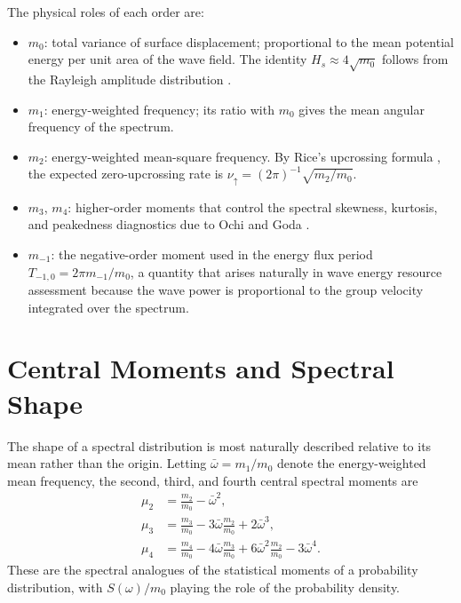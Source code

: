 \documentclass[journal]{IEEEtran}
\begin{document}
    The physical roles of each order are:
    \begin{itemize}
        \item $m_0$: total variance of surface displacement; proportional to the
        mean potential energy per unit area of the wave field.
        The identity $H_s \approx 4\sqrt{m_0}$ follows from the Rayleigh
        amplitude distribution \cite{Cartwright1956}.
        \item $m_1$: energy-weighted frequency; its ratio with $m_0$ gives the
        mean angular frequency of the spectrum.
        \item $m_2$: energy-weighted mean-square frequency.
        By Rice's upcrossing formula \cite{Rice1944, LonguetHiggins1952},
        the expected zero-upcrossing rate is
        $\nu_\uparrow = (2\pi)^{-1}\sqrt{m_2/m_0}$.
        \item $m_3$, $m_4$: higher-order moments that control the spectral
        skewness, kurtosis, and peakedness diagnostics due to
        Ochi \cite{Ochi1998} and Goda \cite{Goda1970}.
        \item $m_{-1}$: the negative-order moment used in the energy flux
        period $T_{-1,0} = 2\pi m_{-1}/m_0$, a quantity that arises
        naturally in wave energy resource assessment because the wave
        power is proportional to the group velocity integrated over
        the spectrum.
    \end{itemize}

    \section{Central Moments and Spectral Shape}
    \label{sec:central}

    The shape of a spectral distribution is most naturally described
    relative to its mean rather than the origin.
    Letting $\bar\omega = m_1/m_0$ denote the energy-weighted mean frequency,
    the second, third, and fourth central spectral moments are
    \begin{align}
        \mu_2 &= \frac{m_2}{m_0} - \bar\omega^2,
        \label{eq:mu2}\\
        \mu_3 &= \frac{m_3}{m_0} - 3\bar\omega\frac{m_2}{m_0} + 2\bar\omega^3,
        \label{eq:mu3}\\
        \mu_4 &= \frac{m_4}{m_0}
        - 4\bar\omega\frac{m_3}{m_0}
        + 6\bar\omega^2\frac{m_2}{m_0}
        - 3\bar\omega^4.
        \label{eq:mu4}
    \end{align}
    These are the spectral analogues of the statistical moments of a
    probability distribution, with $S(\omega)/m_0$ playing the role of
    the probability density.
\end{document}

